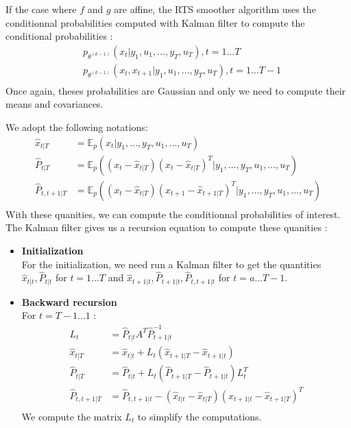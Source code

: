 If the case where $f$ and $g$ are affine, the RTS smoother algorithm uses the conditionnal probabilities computed with Kalman filter to compute the conditional probabilities :
\begin{align*}
  &p_{\theta^{(k-1)}}\left(x_t|y_1, u_1, \ldots, y_T, u_T \right ), t=1 \ldots T\\
  &p_{\theta^{(k-1)}}\left(x_t, x_{t+1}|y_1, u_1, \ldots, y_T, u_T \right ), t=1 \ldots T-1\\
\end{align*}
Once again, theses probabilities are Gaussian and only we need to compute their means and covariances.

We adopt the following notations:
\begin{align*}
  \hat{x}_{t|T} &= \mathbb{E}_p(x_t|y_1, \ldots , y_T, u_1, \ldots , u_T) \\
  \hat{P}_{t|T} &= \mathbb{E}_p \left ((x_t - \hat{x}_{t|T})(x_t - \hat{x}_{t|T})^T|y_1, \ldots , y_T, u_1, \ldots , u_T \right ) \\
  \hat{P}_{t,t+1|T} &= \mathbb{E}_p \left ((x_t - \hat{x}_{t|T})(x_{t+1} - \hat{x}_{t+1|T})^T|y_1, \ldots , y_T, u_1, \ldots , u_T \right ) \\
\end{align*}
With these quanities, we can compute the conditionnal probabilities of interest.
The Kalman filter gives us a recursion equation to compute these quanities :
\begin{itemize}
  \item \textbf{Initialization}\\
    For the initialization, we need run a Kalman filter to get the quantities $\hat{x}_{t|t}, \hat{P}_{t|t}$ for $t=1 \ldots T$ and $\hat{x}_{t+1|t}, \hat{P}_{t+1|t}, \hat{P}_{t,t+1|t}$ for $t=a \ldots T-1$.
  \item \textbf{Backward recursion}\\
    For $t=T-1 \ldots 1$ :
    \begin{align*}
      L_t &= \hat{P}_{t|t}A^T\hat{P}_{t+1|t}^{-1}\\
      \hat{x}_{t|T} &= \hat{x}_{t|t} + L_t(\hat{x}_{t+1|T} - \hat{x}_{t+1|t})\\
      \hat{P}_{t|T} &= \hat{P}_{t|t} + L_t(\hat{P}_{t+1|T} - \hat{P}_{t+1|t})L_t^T\\
      \hat{P}_{t,t+1|T} &= \hat{P}_{t,t+1|t} - (\hat{x}_{t|t} - \hat{x}_{t|T})(\hat{x}_{t+1|t} - \hat{x}_{t+1|T})^T\\
    \end{align*}
    We compute the matrix $L_{t}$ to simplify the computations.
\end{itemize}

